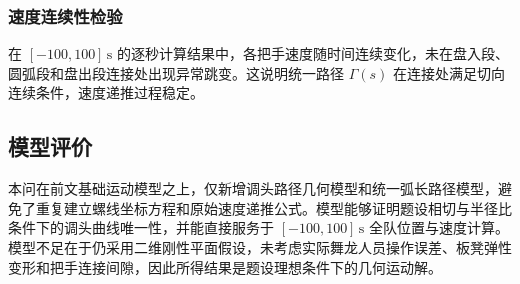 \subsubsection{速度连续性检验}

在 $[-100,100]\,\mathrm{s}$ 的逐秒计算结果中，各把手速度随时间连续变化，未在盘入段、圆弧段和盘出段连接处出现异常跳变。这说明统一路径 $\Gamma(s)$ 在连接处满足切向连续条件，速度递推过程稳定。

\subsection{模型评价}

本问在前文基础运动模型之上，仅新增调头路径几何模型和统一弧长路径模型，避免了重复建立螺线坐标方程和原始速度递推公式。模型能够证明题设相切与半径比条件下的调头曲线唯一性，并能直接服务于 $[-100,100]\,\mathrm{s}$ 全队位置与速度计算。模型不足在于仍采用二维刚性平面假设，未考虑实际舞龙人员操作误差、板凳弹性变形和把手连接间隙，因此所得结果是题设理想条件下的几何运动解。
